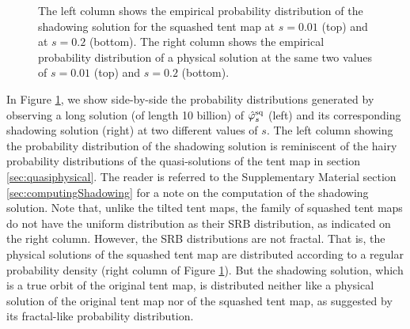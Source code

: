 \begin{figure}
    \caption{The left column shows the empirical probability distribution of the shadowing solution for the squashed tent map at $s=0.01$ (top) and at $s=0.2$ (bottom). The right column shows the empirical probability distribution of a physical solution at the same two values of $s = 0.01$ (top) and $s = 0.2$ (bottom).}
    \label{fig:tent_squashed_shadow}
\end{figure}
In Figure \ref{fig:tent_squashed_shadow}, we show side-by-side the probability distributions generated by observing a long solution (of length 10 billion) 
of $\hat{\varphi}^{\rm sq}_s$ (left) and its corresponding shadowing solution (right)
at two different values of $s.$ The left column showing the probability distribution of the shadowing solution is reminiscent of the hairy probability distributions of 
the quasi-solutions of the tent map in section \ref{sec:quasiphysical}. The reader is referred to the Supplementary Material section \ref{sec:computingShadowing} for a note on the computation of the shadowing solution. Note that, unlike the tilted tent maps, the family of squashed tent maps do not have the uniform distribution as their SRB distribution, as indicated on the right column. However, the SRB distributions are not fractal. That is, the physical solutions of the squashed tent map are distributed according to a regular probability density (right column of Figure \ref{fig:tent_squashed_shadow}). But the shadowing solution, which is a true orbit of the original tent map, is distributed neither like a physical solution of the original tent map nor of the squashed tent map, as suggested by its fractal-like probability distribution. 

